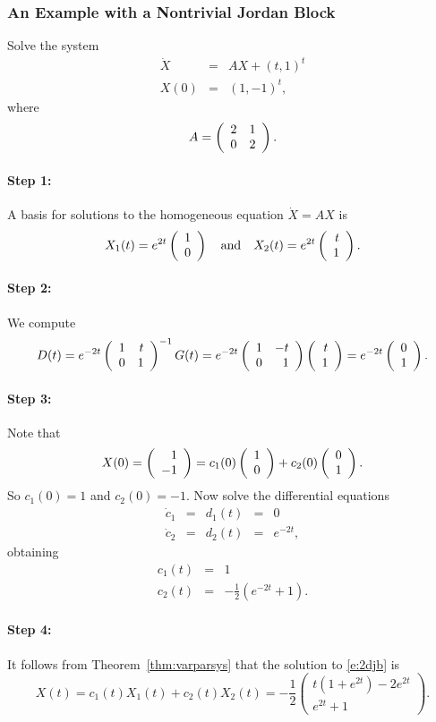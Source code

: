 \documentclass{ximera}
\begin{document}
\subsubsection*{An Example with a Nontrivial Jordan Block}

Solve the system
\begin{equation}  \label{e:2djb}
\begin{array}{rcl}
\dot{X} & = & A X + (t,1)^t \\
X(0) & = & (1,-1)^t,
\end{array}
\end{equation}
where 
\[
A = \left(\begin{array}{rr} 2 & 1\\ 0 &2\end{array}\right).
\]

\paragraph{Step 1:}  A basis for solutions to the homogeneous equation 
$\dot{X}=AX$ is
\[
X_1(t) = e^{2t}\left(\begin{array}{r} 1 \\ 0\end{array}\right) \quad\mbox{and}\quad X_2(t) = e^{2t}\left(\begin{array}{r} t \\ 1\end{array}\right).
\]

\paragraph{Step 2:}  We compute
\[
D(t) =  e^{-2t}\left(\begin{array}{rr} 1 & t\\ 0 &1\end{array}\right)^{-1} G(t) = 
e^{-2t}\left(\begin{array}{rr} 1 & -t\\ 0 &1\end{array}\right)\left(\begin{array}{r} t \\ 1\end{array}\right) = e^{-2t}\left(\begin{array}{r} 0 \\ 1\end{array}\right).
\]

\paragraph{Step 3:}  Note that 
\[
X(0) = \left(\begin{array}{r} 1 \\ -1\end{array}\right) = c_1(0)\left(\begin{array}{r} 1 \\ 0\end{array}\right) + c_2(0)\left(\begin{array}{r} 0 \\ 1\end{array}\right).
\]
So $c_1(0)=1$ and $c_2(0)=-1$.  Now solve the differential equations
\[
\begin{array}{rclcl}
\dot{c}_1 & = & d_1(t) & = & 0 \\
\dot{c}_2 & = & d_2(t) & = & e^{-2t},
\end{array}
\]
obtaining
\begin{eqnarray*}
c_1(t) & = & 1 \\
c_2(t) & = & -\frac{1}{2}(e^{-2t}+1).
\end{eqnarray*}

\paragraph{Step 4:}  It follows from Theorem~\ref{thm:varparsys} that the 
solution to \eqref{e:2djb} is
\[
X(t) = c_1(t)X_1(t) + c_2(t)X_2(t) = -\frac{1}{2}\left(\begin{array}{c}
t(1+e^{2t})-2e^{2t} \\ e^{2t}+1 \end{array}\right).
\]
 
\end{document}
